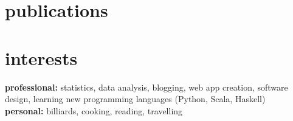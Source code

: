\documentclass[]{friggeri-cv} %
\begin{document}

\section{publications}




\begin{refsection} %
\nocite{*}
\printbibliography[sorting=chronological, type=inproceedings, title={conferences}, heading=bibheading]
\end{refsection}




\section{interests}

\textbf{professional:} statistics, data analysis, blogging, web app creation, software design, learning new programming languages (Python, Scala, Haskell) \\ 
\textbf{personal:} billiards, cooking, reading, travelling


\end{document}
